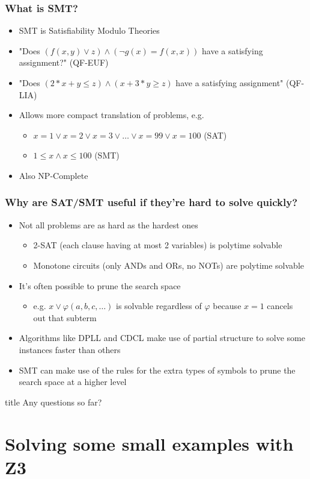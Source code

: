 \documentclass[aspectratio=169]{beamer}
\newcommand{\questionsslide}[1]{
  \begin{frame}
  \vfill
  \centering
  \begin{beamercolorbox}[sep=8pt,center,shadow=true,rounded=true]{title}
    \usebeamerfont{title}Any questions#1?\par%
  \end{beamercolorbox}
  \vfill
  \end{frame}
}
\begin{document}
\begin{frame}[fragile]
\frametitle{What is SMT?}
\begin{itemize}
\item SMT is Satisfiability Modulo Theories
\item "Does $(f(x,y) \lor z) \land (\neg g(x) = f(x, x))$ have a satisfying assignment?" (QF-EUF)
\item "Does $(2*x+y \le z) \land (x+3*y \ge z)$ have a satisfying assignment" (QF-LIA)
\item Allows more compact translation of problems, e.g.
\begin{itemize}
\item $x = 1 \lor x = 2 \lor x = 3 \lor \hdots \lor x = 99 \lor x = 100$ (SAT)
\item $1 \le x \land x \le 100$ (SMT)
\end{itemize}
\item Also NP-Complete
\end{itemize}
\end{frame}

\begin{frame}[fragile]
\frametitle{Why are SAT/SMT useful if they're hard to solve quickly?}
\begin{itemize}
\item Not all problems are as hard as the hardest ones
\begin{itemize}
\item 2-SAT (each clause having at most 2 variables) is polytime solvable
\item Monotone circuits (only ANDs and ORs, no NOTs) are polytime solvable
\end{itemize}
\item It's often possible to prune the search space 
\begin{itemize}
\item e.g. $x \lor \varphi(a, b, c, \hdots)$ is solvable regardless of $\varphi$ because $x=1$ cancels out that subterm
\end{itemize}
\item Algorithms like DPLL and CDCL make use of partial structure to solve some instances faster than others
\item SMT can make use of the rules for the extra types of symbols to prune the search space at a higher level
\end{itemize}
\end{frame}

\questionsslide{ so far}
\section{Solving some small examples with Z3}
\end{document}
